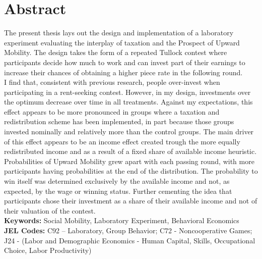 \chapter*{Abstract}

The present thesis lays out the design and implementation of a laboratory experiment evaluating the interplay of taxation and the Prospect of Upward Mobility. The design takes the form of a repeated Tullock contest where participants decide how much to work and can invest part of their earnings to increase their chances of obtaining a higher piece rate in the following round.\\

I find that, consistent with previous research, people over-invest when participating in a rent-seeking contest. However, in my design, investments over the optimum decrease over time in all treatments. Against my expectations, this effect appears to be more pronounced in groups where a taxation and redistribution scheme has been implemented, in part because those groups invested nominally and relatively more than the control groups. The main driver of this effect appears to be an income effect created trough the more equally redistributed income and as a result of a fixed share of available income heuristic.\\

Probabilities of Upward Mobility grew apart with each passing round, with more participants having probabilities at the end of the distribution. The probability to win itself was determined exclusively by the available income and not, as expected, by the wage or winning status. Further cementing the idea that participants chose their investment as a share of their available income and not of their valuation of the contest.\\


\textbf{Keywords:} Social Mobility, Laboratory Experiment, Behavioral Economics\\

\textbf{JEL Codes:} 
C92 – Laboratory, Group Behavior; C72 - Noncooperative Games;
J24 - (Labor and Demographic Economics - Human Capital, Skills, Occupational Choice, Labor Productivity)\\